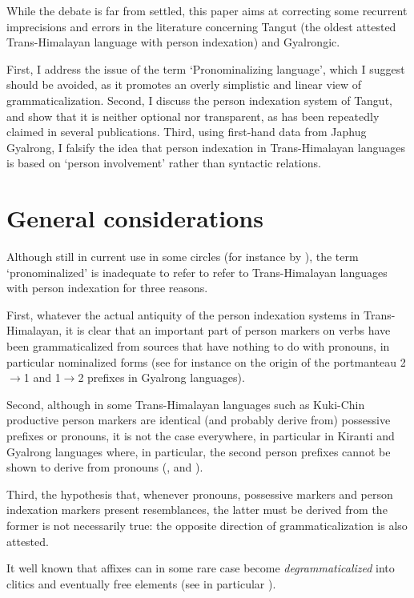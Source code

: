 \documentclass[oldfontcommands,oneside,a4paper,11pt]{article}
\begin{document}
While the debate is far from settled, this paper aims at correcting some recurrent imprecisions and errors in the literature concerning Tangut (the oldest attested Trans-Himalayan language with person indexation) and Gyalrongic. 

First, I address the issue of the term `Pronominalizing language', which I suggest should be avoided, as it promotes an overly simplistic and linear view of grammaticalization. Second, I discuss the person indexation system of Tangut, and show that it is neither optional nor transparent, as has been repeatedly claimed in several publications. Third,  using first-hand data from Japhug Gyalrong, I falsify the idea that person indexation in Trans-Himalayan languages is based on `person involvement' rather than syntactic relations.

\section{General considerations}
Although still in current use in some circles (for instance by \citealt{zeisler15eat}), the term `pronominalized'  is inadequate to refer to refer to Trans-Himalayan languages with person indexation for three reasons.

First, whatever the actual antiquity of the person indexation systems in Trans-Himalayan, it is clear that an important part of person markers on verbs have been grammaticalized from sources that have nothing to do with pronouns, in particular nominalized forms (see for instance \citealt{jacques15generic} on the origin of the portmanteau 2$\rightarrow$1 and 1$\rightarrow$2 prefixes in Gyalrong languages).

Second, although in some Trans-Himalayan languages such as Kuki-Chin productive person markers are identical (and probably derive from) possessive prefixes or pronouns, it is not the case everywhere, in particular in Kiranti and Gyalrong languages where, in particular, the second person prefixes cannot be shown to derive from pronouns (\citealt{jacques12agreement}, \citealt{delancey11prefixes} and \citealt{delancey14second}).

Third, the hypothesis that, whenever pronouns, possessive markers and person indexation markers present resemblances, the latter must be derived from the former is not necessarily true: the opposite direction of grammaticalization is also attested. 
 
It well known that affixes can in some rare case become \textit{degrammaticalized} into clitics and eventually free elements (see in particular \citealt{norde09degrammaticalization, hyman11macrosudan}). 
\end{document}
